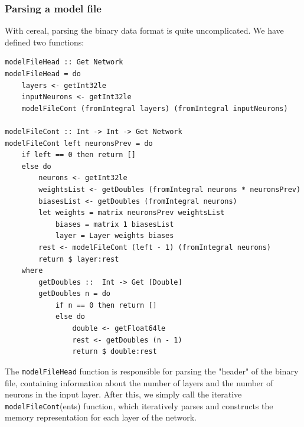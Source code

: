 \documentclass[12pt, titlepage]{article}
\begin{document}
\subsubsection{Parsing a model file}
With cereal, parsing the binary data format is quite uncomplicated. We have defined two functions:
\begin{lstlisting}
modelFileHead :: Get Network
modelFileHead = do
	layers <- getInt32le
	inputNeurons <- getInt32le
	modelFileCont (fromIntegral layers) (fromIntegral inputNeurons)

modelFileCont :: Int -> Int -> Get Network
modelFileCont left neuronsPrev = do
	if left == 0 then return []
	else do
		neurons <- getInt32le
		weightsList <- getDoubles (fromIntegral neurons * neuronsPrev)
		biasesList <- getDoubles (fromIntegral neurons)
		let weights = matrix neuronsPrev weightsList
			biases = matrix 1 biasesList
			layer = Layer weights biases
		rest <- modelFileCont (left - 1) (fromIntegral neurons)
		return $ layer:rest
	where
		getDoubles ::  Int -> Get [Double]
		getDoubles n = do
			if n == 0 then return []
			else do
				double <- getFloat64le
				rest <- getDoubles (n - 1)
				return $ double:rest	
\end{lstlisting}
The \verb|modelFileHead| function is responsible for parsing the "header" of the binary file, containing information about the number of layers and the number of neurons in the input layer. After this, we simply call the iterative \verb|modelFileCont|(ents) function, which iteratively parses and constructs the memory representation for each layer of the network.
\end{document}
